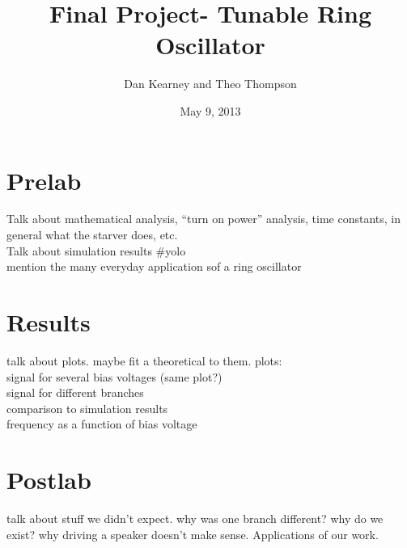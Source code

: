 \documentclass{article}
\title{Final Project- Tunable Ring Oscillator}
\author{Dan Kearney and Theo Thompson}
\date{May 9, 2013}
\begin{document}
\maketitle

\section*{Prelab}
Talk about mathematical analysis, ``turn on power'' analysis, time constants, in general what the starver does, etc.\\
Talk about simulation results #yolo\\
mention the many everyday application sof a ring oscillator

\section{Results}
talk about plots. maybe fit a theoretical to them.
plots:\\
signal for several bias voltages (same plot?)\\
signal for different branches\\
comparison to simulation results\\
frequency as a function of bias voltage\
\section{Postlab}
talk about stuff we didn't expect. why was one branch different? why do we exist? why driving a speaker doesn't make sense. Applications of our work.

\end{document}

